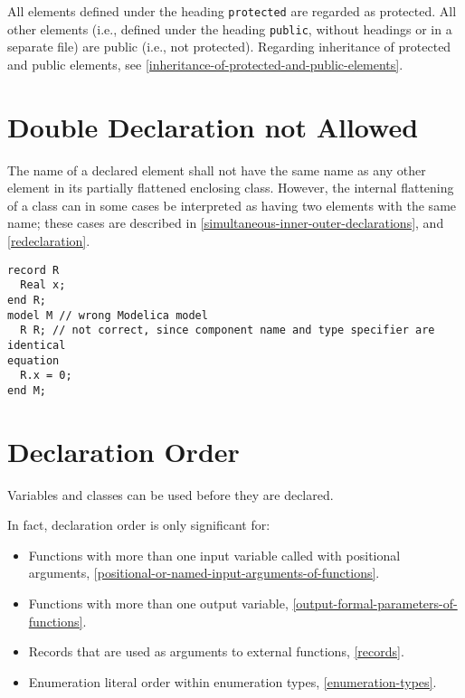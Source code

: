 All elements defined under the heading \lstinline!protected! are regarded as protected.
All other elements (i.e., defined under the heading \lstinline!public!, without headings or in a separate file) are public (i.e., not protected).
Regarding inheritance of protected and public elements, see \cref{inheritance-of-protected-and-public-elements}.


\section{Double Declaration not Allowed}\label{double-declaration-not-allowed}

The name of a declared element shall not have the same name as any other element in its partially flattened enclosing class.
However, the internal flattening of a class can in some cases be interpreted as having two elements with the same name; these cases are described in \cref{simultaneous-inner-outer-declarations}, and \cref{redeclaration}.

\begin{example}
\begin{lstlisting}[language=modelica]
record R
  Real x;
end R;
model M // wrong Modelica model
  R R; // not correct, since component name and type specifier are identical
equation
  R.x = 0;
end M;
\end{lstlisting}
\end{example}

\section{Declaration Order}\label{declaration-order}\label{declaration-order-and-usage-before-declaration}

Variables and classes can be used before they are declared.

\begin{nonnormative}
In fact, declaration order is only significant for:
\begin{itemize}
\item
  Functions with more than one input variable called with positional arguments, \cref{positional-or-named-input-arguments-of-functions}.
\item
  Functions with more than one output variable, \cref{output-formal-parameters-of-functions}.
\item
  Records that are used as arguments to external functions, \cref{records}.
\item
  Enumeration literal order within enumeration types, \cref{enumeration-types}.
\end{itemize}
\end{nonnormative}


